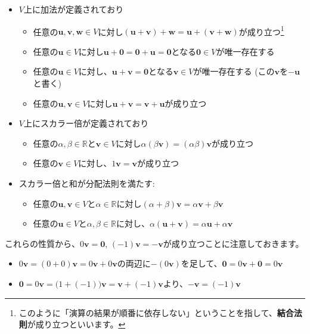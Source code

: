 \begin{itemize}
\item $V$上に加法が定義されており
\begin{itemize}
\item 任意の$\bm{u}, \bm{v}, \bm{w}\in V$に対し$(\bm{u} + \bm{v}) + \bm{w} = \bm{u} + (\bm{v} + \bm{w})$が成り立つ\footnote{このように「演算の結果が順番に依存しない」ということを指して、\textbf{結合法則}が成り立つといいます。}
\item 任意の$\bm{u}\in V$に対し$\bm{u} + \bm{0} = \bm{0} + \bm{u} = \bm{0}$となる$\bm{0}\in V$が唯一存在する
\item 任意の$\bm{u}\in V$に対し、$\bm{u} + \bm{v} = \bm{0}$となる$\bm{v}\in V$が唯一存在する (この$\bm{v}$を$-\bm{u}$と書く)
\item 任意の$\bm{u}, \bm{v}\in V$に対し$\bm{u} + \bm{v} = \bm{v} + \bm{u}$が成り立つ
\end{itemize}
\item $V$上にスカラー倍が定義されており
\begin{itemize}
\item 任意の$\alpha, \beta\in\mathbb{R}$と$\bm{v}\in V$に対し$\alpha(\beta\bm{v})=(\alpha\beta)\bm{v}$が成り立つ
\item 任意の$\bm{v}\in V$に対し、$1\bm{v}=\bm{v}$が成り立つ
\end{itemize}
\item スカラー倍と和が分配法則を満たす: 
\begin{itemize}
\item 任意の$\bm{u}, \bm{v}\in V$と$\alpha\in\mathbb{R}$に対し$(\alpha + \beta)\bm{v} = \alpha\bm{v} + \beta\bm{v}$
\item 任意の$\bm{u}\in V$と$\alpha,\beta\in\mathbb{R}$に対し、$\alpha(\bm{u} + \bm{v}) = \alpha\bm{u} + \alpha\bm{v}$
\end{itemize}
\end{itemize}

これらの性質から、$0\bm{v}=\bm{0}$, $(-1)\bm{v} = -\bm{v}$が成り立つことに注意しておきます。
\begin{itemize}
\item $0 \bm{v} = (0 + 0) \bm{v} = 0\bm{v} + 0\bm{v}$の両辺に$-(0\bm{v})$を足して、$\bm{0} = 0\bm{v} + \bm{0} = 0\bm{v}$
\item $\bm{0} = 0\bm{v} = \bigl(1 + (-1)\bigr)\bm{v} = \bm{v} + (-1) \bm{v}$より、$-\bm{v} = (-1)\bm{v}$
\end{itemize}

